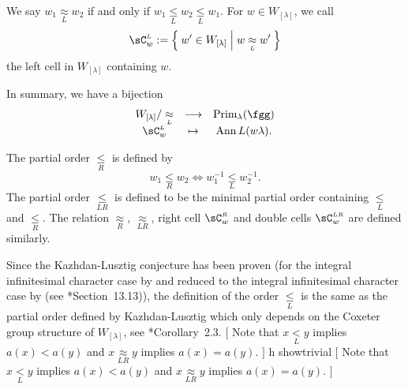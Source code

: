 \documentclass[12pt,a4paper]{amsart}
\newcommand{\trivial}[2][]{\if\relax\detokenize{#1}\relax
  {%
      \color{orange} \vspace{0em} $[$  #2 $]$
      \color{black}
  }
  \else
\ifx#1h
\ifcsname showtrivial\endcsname
{%
    \color{orange} \vspace{0em}  $[$ #2 $]$
    \color{black}
}
\fi
\else {\red Wrong argument!} \fi
\fi
}
\newcommand{\CL}{{\mathcal {L}}}
\newcommand{\CR}{{\mathcal {R}}}
\DeclareMathOperator{\Ann}{Ann}
\numberwithin{equation}{section}
\theoremstyle{remark}
\def\CL{{\sC}^{\scriptscriptstyle L}}
\def\CR{{\sC}^{\scriptscriptstyle R}}
\def\CLR{{\sC}^{\scriptscriptstyle LR}}
\def\LC{{}^{\scriptscriptstyle L}\sC}
\def\Prim{\mathrm{Prim}}
\def\Prim{\mathrm{Prim}}
\def\lneqL{\mathrel{\mathop{<}\limits_{\scriptscriptstyle L}}}
\def\leqL{\mathrel{\mathop{\leq}\limits_{\scriptscriptstyle L}}}
\def\leqR{\mathrel{\mathop{\leq}\limits_{\scriptscriptstyle R}}}
\def\leqLR{\mathrel{\mathop{\leq}\limits_{\scriptscriptstyle LR}}}
\def\approxL{\mathrel{\mathop{\approx}\limits_{\scriptscriptstyle L}}}
\def\approxR{\mathrel{\mathop{\approx}\limits_{\scriptscriptstyle R}}}
\def\approxLR{\mathrel{\mathop{\approx}\limits_{\scriptscriptstyle LR}}}
\begin{document}
We say $w_{1} \approxL w_{2}$ if and only if $w_{1}\leqL w_{2}\leqL w_{1}$. For
$w\in W_{[\lambda]}$, we call
\[
  \CL_{w} := \Set{ w' \in W_{[\lambda]}| w\approxL w'}
\]
the left cell in $W_{[\lambda]}$ containing $w$.

In summary, we have a bijection
\[
  \begin{array}{ccc}
    W_{[\lambda]}/ \approxL &\longrightarrow & \Prim_{\lambda}(\fgg)\\
    \CL_{w} & \mapsto & \Ann L(w\lambda).
  \end{array}
\]



The partial order $\leqR$ is defined by
\[
  w_{1}\leqR w_{2} \Leftrightarrow w_{1}^{-1} \leqL w_{2}^{-1}.
\]
The partial order $\leqLR$ is defined to be the minimal partial order containing
$\leqL$ and $\leqR$. The relation $\approxR$, $\approxLR$, right cell $\CR_{ w}$
and double cells $\CLR_{w}$ are defined similarly.

Since the Kazhdan-Lusztig conjecture has been proven (for the integral
infinitesimal character case by \cite{BB,BK} and reduced to the integral
infinitesimal character case by \cite{Soergel} (see \cite{H}*{Section~13.13})),
the definition of the order $\leqL$ is the same as the partial order defined by
Kazhdan-Lusztig \cite{KL} which only depends on the Coxeter group structure of
$W_{[\lambda]}$, see \cite{BV2}*{Corollary~2.3}. \trivial[]{ Note that
  $x\lneqL y$ implies $a(x)<a(y)$ and $x\approxLR y$ implies $a(x)=a(y)$. }
\end{document}
